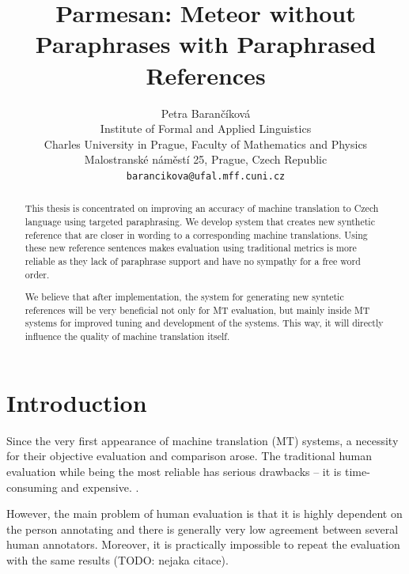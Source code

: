 \documentclass[11pt]{article}
\title{Parmesan: Meteor without Paraphrases with Paraphrased References}
\author{Petra Barančíková \\
  Institute of Formal and Applied Linguistics \\
  Charles University in Prague, Faculty of Mathematics and Physics\\
  Malostranské náměstí 25, Prague, Czech Republic \\
  {\tt barancikova@ufal.mff.cuni.cz} \\}
\date{}
\begin{document}
\maketitle
\begin{abstract}
This thesis is concentrated on improving an accuracy of machine translation
to Czech language using targeted paraphrasing. We develop system that creates
new synthetic reference that are closer in wording to a corresponding machine
translations. Using these new reference sentences makes evaluation using traditional
metrics is more reliable as they lack of paraphrase support and have no sympathy
for a free word order.

We believe that after implementation, the system for generating new syntetic
references will be very beneficial not only for MT evaluation, but mainly
inside MT systems for improved tuning and development of the systems. This way,
it will directly influence the quality of machine translation itself.

\end{abstract}

\section{Introduction}
Since the very first appearance of machine translation (MT) systems, a necessity
for their objective evaluation and comparison arose. The traditional human evaluation 
while being the most reliable has serious drawbacks -- it is time-consuming and expensive.
.%

However, the main problem of human evaluation is that it is highly dependent on the 
person annotating and there is generally very low agreement between several human
annotators. %
Moreover, it is practically impossible to repeat the evaluation with the same
results (TODO: nejaka citace).
\end{document}
